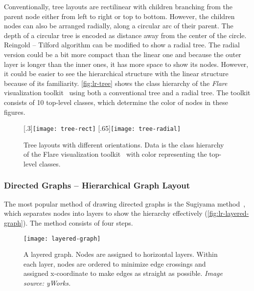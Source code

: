 Conventionally, tree layouts are rectilinear with children branching from the parent node either from left to right or top to bottom. However, the children nodes can also be arranged radially, along a circular arc of their parent. The depth of a circular tree is encoded as distance away from the center of the circle. Reingold -- Tilford algorithm can be modified to show a radial tree. The radial version could be a bit more compact than the linear one and because the outer layer is longer than the inner ones, it has more space to show its nodes. However, it could be easier to see the hierarchical structure with the linear structure because of its familiarity. \autoref{fig:lr-tree} shows the class hierarchy of the \emph{Flare} visualization toolkit~\cite{Heer2009b} using both a conventional tree and a radial tree. The toolkit consists of 10 top-level classes, which determine the color of nodes in these figures.

\begin{figure}[!htb]
\centering
{}[.3\columnwidth]{\texttt{[image: tree-rect]}}
\hfill
{}[.65\columnwidth]{\texttt{[image: tree-radial]}}
\caption[Tree layouts with different orientations]{Tree layouts with different orientations. Data is the class hierarchy of the Flare visualization toolkit~\cite{Heer2009b} with color representing the top-level classes.}
\label{fig:lr-tree}
\end{figure}
  
\subsubsection{Directed Graphs -- Hierarchical Graph Layout}	
The most popular method of drawing directed graphs is the Sugiyama method~\cite{Sugiyama1981}, which separates nodes into layers to show the hierarchy effectively (\autoref{fig:lr-layered-graph}). The method consists of four steps.

\begin{figure}[!htb]
	\centering
	\texttt{[image: layered-graph]}
	\caption[A layered graph]{A layered graph. Nodes are assigned to horizontal layers. Within each layer, nodes are ordered to minimize edge crossings and assigned x-coordinate to make edges as straight as possible. \textrm{\emph{Image source: yWorks.}}}
	\label{fig:lr-layered-graph}
\end{figure}

